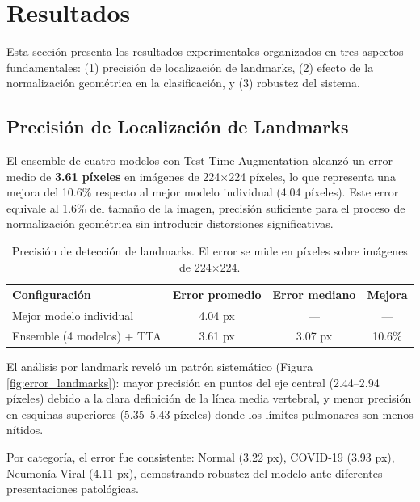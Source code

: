 \documentclass[runningheads]{llncs}
\begin{document}
\section{Resultados}
\label{sec:resultados}

Esta sección presenta los resultados experimentales organizados en tres aspectos fundamentales: (1) precisión de localización de landmarks, (2) efecto de la normalización geométrica en la clasificación, y (3) robustez del sistema.

\subsection{Precisión de Localización de Landmarks}

El ensemble de cuatro modelos con Test-Time Augmentation alcanzó un error medio de \textbf{3.61 píxeles} en imágenes de 224×224 píxeles, lo que representa una mejora del 10.6\% respecto al mejor modelo individual (4.04 píxeles). Este error equivale al 1.6\% del tamaño de la imagen, precisión suficiente para el proceso de normalización geométrica sin introducir distorsiones significativas.

\begin{table}[!h]
\centering
\caption{Precisión de detección de landmarks. El error se mide en píxeles sobre imágenes de 224×224.}
\label{tab:landmarks}
\begin{tabular}{lccc}
\toprule
\textbf{Configuración} & \textbf{Error promedio} & \textbf{Error mediano} & \textbf{Mejora} \\
\midrule
Mejor modelo individual & 4.04 px & --- & --- \\
Ensemble (4 modelos) + TTA & 3.61 px & 3.07 px & 10.6\% \\
\bottomrule
\end{tabular}
\end{table}

El análisis por landmark reveló un patrón sistemático (Figura \ref{fig:error_landmarks}): mayor precisión en puntos del eje central (2.44--2.94 píxeles) debido a la clara definición de la línea media vertebral, y menor precisión en esquinas superiores (5.35--5.43 píxeles) donde los límites pulmonares son menos nítidos.

Por categoría, el error fue consistente: Normal (3.22 px), COVID-19 (3.93 px), Neumonía Viral (4.11 px), demostrando robustez del modelo ante diferentes presentaciones patológicas.
\end{document}
